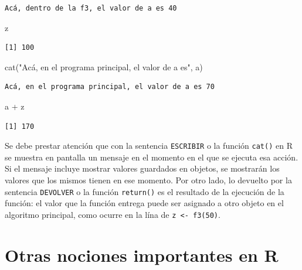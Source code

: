 \documentclass[
]{book}
\newenvironment{Shaded}{\begin{snugshade}}{\end{snugshade}}
\newcommand{\FunctionTok}[1]{\textcolor[rgb]{0.00,0.00,0.00}{#1}}
\newcommand{\NormalTok}[1]{#1}
\newcommand{\SpecialCharTok}[1]{\textcolor[rgb]{0.00,0.00,0.00}{#1}}
\newcommand{\StringTok}[1]{\textcolor[rgb]{0.31,0.60,0.02}{#1}}
\begin{document}
\begin{verbatim}
Acá, dentro de la f3, el valor de a es 40
\end{verbatim}

\begin{Shaded}
\begin{Highlighting}[]
\NormalTok{z}
\end{Highlighting}
\end{Shaded}

\begin{verbatim}
[1] 100
\end{verbatim}

\begin{Shaded}
\begin{Highlighting}[]
\FunctionTok{cat}\NormalTok{(}\StringTok{"Acá, en el programa principal, el valor de a es"}\NormalTok{, a)}
\end{Highlighting}
\end{Shaded}

\begin{verbatim}
Acá, en el programa principal, el valor de a es 70
\end{verbatim}

\begin{Shaded}
\begin{Highlighting}[]
\NormalTok{a }\SpecialCharTok{+}\NormalTok{ z}
\end{Highlighting}
\end{Shaded}

\begin{verbatim}
[1] 170
\end{verbatim}

Se debe prestar atención que con la sentencia \texttt{ESCRIBIR} o la función \texttt{cat()} en R se muestra en pantalla un mensaje en el momento en el que se ejecuta esa acción. Si el mensaje incluye mostrar valores guardados en objetos, se mostrarán los valores que los mismos tienen en ese momento. Por otro lado, lo devuelto por la sentencia \texttt{DEVOLVER} o la función \texttt{return()} es el resultado de la ejecución de la función: el valor que la función entrega puede ser asignado a otro objeto en el algoritmo principal, como ocurre en la lína de \texttt{z\ \textless{}-\ f3(50)}.

\hypertarget{otras-nociones-importantes-en-r}{%
\section{Otras nociones importantes en R}\label{otras-nociones-importantes-en-r}}
\end{document}
